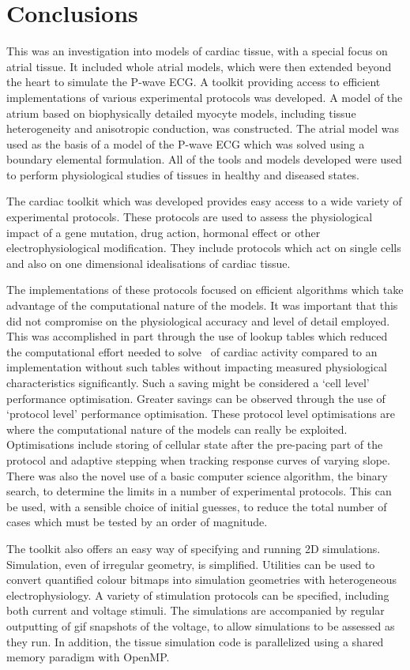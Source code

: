 \chapter{Conclusions}


This was an investigation into models of cardiac tissue, with a special focus on
atrial tissue\cite{foo}.
It included whole atrial models, which were then extended beyond the heart to
simulate the P-wave ECG.
A toolkit providing access to efficient implementations of various experimental
protocols was developed.
A model of the atrium based on biophysically detailed myocyte models, including tissue heterogeneity and anisotropic
conduction, was constructed.
The atrial model was used as the basis of a model of the P-wave ECG which was
solved using a boundary elemental formulation.
All of the tools and models developed were used to perform physiological
studies of tissues in healthy and diseased states.

The cardiac toolkit which was developed provides easy access to a wide variety
of experimental protocols.
These protocols are used to assess the physiological impact of a gene mutation,
drug action, hormonal effect or other electrophysiological modification.
They include protocols which act on single cells and also on one dimensional
idealisations of cardiac tissue.

The implementations of these protocols focused on efficient algorithms
which take advantage of the computational nature of the models.
It was important that this did not compromise on the physiological accuracy and
level of detail employed.
This was accomplished in part through the use of lookup tables which reduced the
computational effort needed to solve \ of cardiac activity compared to an
implementation without such tables without impacting measured physiological
characteristics significantly.
Such a saving might be considered a `cell level' performance optimisation.
Greater savings can be observed through the use of `protocol level' performance
optimisation.
These protocol level optimisations are where the computational nature of the
models can really be exploited.
Optimisations include storing of cellular state after the pre-pacing part of the
protocol and adaptive stepping when tracking response curves of varying slope.
There was also the novel use of a basic computer science algorithm, the binary
search, to determine the limits in a number of experimental protocols.
This can be used, with a sensible choice of initial guesses, to reduce the total
number of cases which must be tested by an order of magnitude.

The toolkit also offers an easy way of specifying and running 2D simulations.
Simulation, even of irregular geometry, is simplified.
Utilities can be used to convert quantified colour bitmaps into simulation
geometries with heterogeneous electrophysiology.
A variety of stimulation protocols can be specified, including both current and
voltage stimuli.
The simulations are accompanied by regular outputting of gif snapshots of the
voltage, to allow simulations to be assessed as they run.
In addition, the tissue simulation code is parallelized using a shared memory
paradigm with OpenMP.


